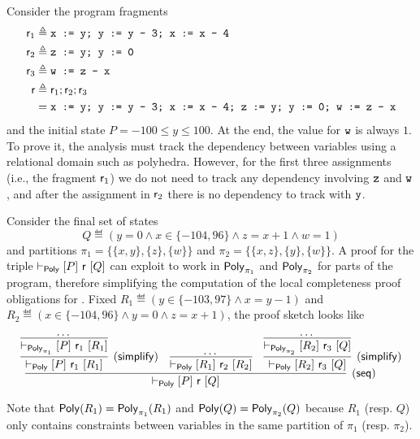 \begin{example}
	Consider the program fragments
	\begin{align*}
		\mathsf{r}_1 &\triangleq \texttt{x := y; y := y - 3; x := x - 4} \\
		\mathsf{r}_2 &\triangleq \texttt{z := y; y := 0} \\
		\mathsf{r}_3 &\triangleq \texttt{w := z - x} \\
		\mathsf{r} &\triangleq \mathsf{r}_1; \mathsf{r}_2; \mathsf{r}_3 \\
		&= \texttt{x := y; y := y - 3; x := x - 4; z := y; y := 0; w := z - x}
	\end{align*}
	and the initial state $P = -100 \le y \le 100$. At the end, the value for $\texttt{w}$ is always $1$. To prove it, the analysis must track the dependency between variables using a relational domain such as polyhedra. However, for the first three assignments (i.e., the fragment $\mathsf{r}_1$) we do not need to track any dependency involving $\texttt{z}$ and $\texttt{w}$, and after the assignment  in $\mathsf{r}_2$ there is no dependency to track with $\texttt{y}$.
	
	Consider the final set of states 
	\[
	Q \eqdef (y = 0 \land x \in \{ -104, 96 \} \land z = x + 1 \land w = 1)
	\]
	and partitions $\pi_1 = \{ \{ x , y \}, \{ z \}, \{ w \} \}$ and $\pi_2 = \{ \{ x, z \}, \{ y \}, \{ w \} \}$.
	A proof for the triple $\vdash_{\mathsf{Poly}}\nobreak[P]~\mathsf{r}~[Q]$ can exploit  to work in $\mathsf{Poly}_{\pi_1}$ and $\mathsf{Poly}_{\pi_2}$ for parts of the program, therefore simplifying the computation of the local completeness proof obligations for . Fixed $R_1 \eqdef (y \in \{ -103, 97 \} \land x = y - 1)$ and $R_2 \eqdef (x \in \{ -104, 96 \} \land y = 0 \land z = x + 1)$, the proof sketch looks like
	
	\[
	\infer[\lclrule{seq}]
	{\lcl{\Poly}{P}{\regr}{Q}}
	{
		\infer[\lclrule{simplify}]
		{\lcl{\Poly}{P}{\regr_1}{R_1}}
		{\infer{\lcl{\Poly_{\pi_1}}{P}{\regr_1}{R_1}}{\dots}}
		&
		\infer{\lcl{\Poly}{R_1}{\regr_2}{R_2}}{\dots}
		&
		\infer[\lclrule{simplify}]
		{\lcl{\Poly}{R_2}{\regr_3}{Q}}
		{\infer{\lcl{\Poly_{\pi_2}}{R_2}{\regr_3}{Q}}{\dots}}
	}
	\]
	
	Note that $\mathsf{Poly}(R_1) = \mathsf{Poly}_{\pi_1}(R_1)$ and $\mathsf{Poly}(Q) = \mathsf{Poly}_{\pi_2}(Q)$ because $R_1$ (resp. $Q$) only contains constraints between variables in the same partition of $\pi_1$ (resp. $\pi_2$).
\end{example}


